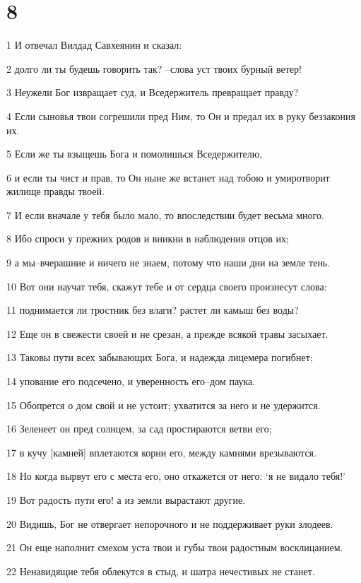 \chapter{8}

\par 1 И отвечал Вилдад Савхеянин и сказал:
\par 2 долго ли ты будешь говорить так? --слова уст твоих бурный ветер!
\par 3 Неужели Бог извращает суд, и Вседержитель превращает правду?
\par 4 Если сыновья твои согрешили пред Ним, то Он и предал их в руку беззакония их.
\par 5 Если же ты взыщешь Бога и помолишься Вседержителю,
\par 6 и если ты чист и прав, то Он ныне же встанет над тобою и умиротворит жилище правды твоей.
\par 7 И если вначале у тебя было мало, то впоследствии будет весьма много.
\par 8 Ибо спроси у прежних родов и вникни в наблюдения отцов их;
\par 9 а мы--вчерашние и ничего не знаем, потому что наши дни на земле тень.
\par 10 Вот они научат тебя, скажут тебе и от сердца своего произнесут слова:
\par 11 поднимается ли тростник без влаги? растет ли камыш без воды?
\par 12 Еще он в свежести своей и не срезан, а прежде всякой травы засыхает.
\par 13 Таковы пути всех забывающих Бога, и надежда лицемера погибнет;
\par 14 упование его подсечено, и уверенность его--дом паука.
\par 15 Обопрется о дом свой и не устоит; ухватится за него и не удержится.
\par 16 Зеленеет он пред солнцем, за сад простираются ветви его;
\par 17 в кучу [камней] вплетаются корни его, между камнями врезываются.
\par 18 Но когда вырвут его с места его, оно откажется от него: `я не видало тебя!'
\par 19 Вот радость пути его! а из земли вырастают другие.
\par 20 Видишь, Бог не отвергает непорочного и не поддерживает руки злодеев.
\par 21 Он еще наполнит смехом уста твои и губы твои радостным восклицанием.
\par 22 Ненавидящие тебя облекутся в стыд, и шатра нечестивых не станет.

